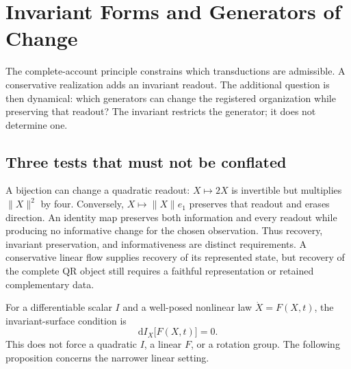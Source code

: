 \begingroup
\renewcommand{\thesection}{37A}
\section{Invariant Forms and Generators of Change}\label{sec:conservativedynamics}
The complete-account principle constrains which transductions are admissible. A conservative realization adds an invariant readout. The additional question is then dynamical: which generators can change the registered organization while preserving that readout? The invariant restricts the generator; it does not determine one.

\subsection{Three tests that must not be conflated}
A bijection can change a quadratic readout: $X\mapsto2X$ is invertible but multiplies $\|X\|^2$ by four. Conversely, $X\mapsto\|X\|e_1$ preserves that readout and erases direction. An identity map preserves both information and every readout while producing no informative change for the chosen observation. Thus recovery, invariant preservation, and informativeness are distinct requirements. A conservative linear flow supplies recovery of its represented state, but recovery of the complete QR object still requires a faithful representation or retained complementary data.

For a differentiable scalar $I$ and a well-posed nonlinear law $\dot X=F(X,t)$, the invariant-surface condition is
\begin{equation}
\mathrm dI_X\bigl[F(X,t)\bigr]=0.
\tag{CD1}\label{eq:invariantsurface}
\end{equation}
This does not force a quadratic $I$, a linear $F$, or a rotation group. The following proposition concerns the narrower linear setting.

